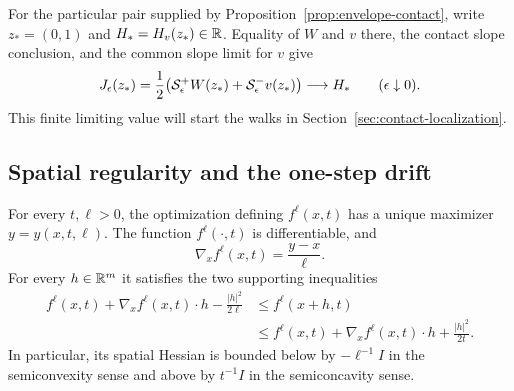 For the particular pair supplied by Proposition~\ref{prop:envelope-contact},
write $z_*=(0,1)$ and $H_*=H_v(z_*)\in\mathbb{R}$.  Equality of $W$ and $v$ there,
the contact slope conclusion, and the common slope limit for $v$ give
\begin{equation}\label{eq:dp-J-contact}
  J_\epsilon(z_*)
  =\frac12\bigl(\mathcal{S}^+_\epsilon W(z_*)+
                    \mathcal{S}^-_\epsilon v(z_*)\bigr)
  \longrightarrow H_*\qquad(\epsilon\downarrow0).
\end{equation}
This finite limiting value will start the walks in
Section~\ref{sec:contact-localization}.

\subsection{Spatial regularity and the one-step drift}

\begin{lemma}\label{lem:dp-spatial-regularity}
For every $t,\ell>0$, the optimization defining $f^\ell(x,t)$ has a unique
maximizer $y=y(x,t,\ell)$.  The function $f^\ell(\cdot,t)$ is differentiable,
and
\begin{equation}\label{eq:dp-gradient}
  \nabla_x f^\ell(x,t)=\frac{y-x}{\ell}.
\end{equation}
For every $h\in\mathbb{R}^m$ it satisfies the two supporting inequalities
\begin{equation}\label{eq:dp-supports}
\begin{split}
  f^\ell(x,t)+\nabla_x f^\ell(x,t)\cdot h-\frac{|h|^2}{2\ell}
  &\le f^\ell(x+h,t)\\
  &\le f^\ell(x,t)+\nabla_x f^\ell(x,t)\cdot h+\frac{|h|^2}{2t}.
\end{split}
\end{equation}
In particular, its spatial Hessian is bounded below by $-\ell^{-1}I$ in the
semiconvexity sense and above by $t^{-1}I$ in the semiconcavity sense.
\end{lemma}

